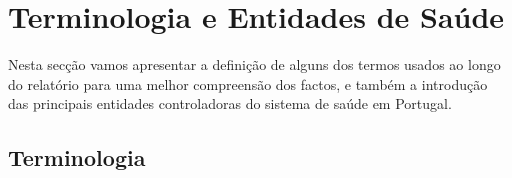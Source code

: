 \documentclass[conference]{IEEEtran}
\begin{document}

\section{Terminologia e Entidades de Saúde} \label{term_ent}

Nesta secção vamos apresentar a definição de alguns dos termos usados ao longo do relatório para uma melhor compreensão dos factos, e também a introdução das principais entidades controladoras do sistema de saúde em Portugal.

\subsection{Terminologia}
\end{document}
